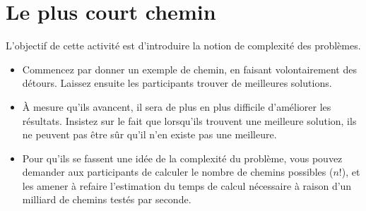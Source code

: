 \documentclass[a5paper,pagesize,DIV=14]{scrbook}
\begin{document}
\section*{Le plus court chemin}

L'objectif de cette activité est d'introduire la notion de complexité des problèmes.

\begin{itemize}
  \item Commencez par donner un exemple de chemin, en faisant volontairement des détours. Laissez ensuite les participants trouver de meilleures solutions. 
  \item À mesure qu'ils avancent, il sera de plus en plus difficile d'améliorer les résultats. Insistez sur le fait que lorsqu'ils trouvent une meilleure solution, ils ne peuvent pas être sûr qu'il n'en existe pas une meilleure.
  \item Pour qu'ils se fassent une idée de la complexité du problème, vous pouvez demander aux participants de calculer le nombre de chemins possibles ($n!$), et les amener à refaire l'estimation du temps de calcul nécessaire à raison d'un milliard de chemins testés par seconde.
\end{itemize}
\end{document}
